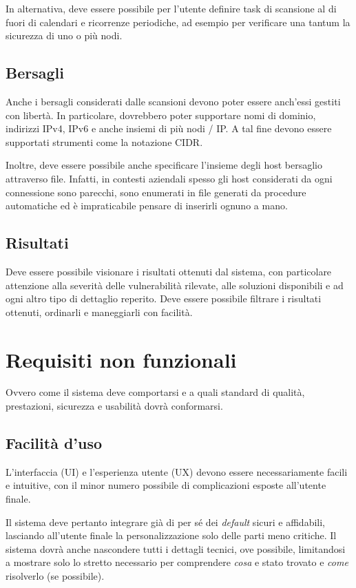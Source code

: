In alternativa, deve essere possibile per l'utente definire task di scansione al di fuori di calendari e ricorrenze periodiche, ad esempio per verificare una tantum la sicurezza di uno o più nodi.

\subsection{Bersagli}
Anche i bersagli considerati dalle scansioni devono poter essere anch'essi gestiti con libertà. In particolare, dovrebbero poter supportare nomi di dominio, indirizzi IPv4, IPv6 e anche insiemi di più nodi / IP. A tal fine devono essere supportati strumenti come la notazione CIDR.

Inoltre, deve essere possibile anche specificare l'insieme degli host bersaglio attraverso file. Infatti, in contesti aziendali spesso gli host considerati da ogni connessione sono parecchi, sono enumerati in file generati da procedure automatiche ed è impraticabile pensare di inserirli ognuno a mano.

\subsection{Risultati}
Deve essere possibile visionare i risultati ottenuti dal sistema, con particolare attenzione alla severità delle vulnerabilità rilevate, alle soluzioni disponibili e ad ogni altro tipo di dettaglio reperito. Deve essere possibile filtrare i risultati ottenuti, ordinarli e maneggiarli con facilità.

\section{Requisiti non funzionali}
Ovvero come il sistema deve comportarsi e a quali standard di qualità, prestazioni, sicurezza e usabilità dovrà conformarsi.

\subsection{Facilità d'uso}
L'interfaccia (UI) e l'esperienza utente (UX) devono essere necessariamente facili e intuitive, con il minor numero possibile di complicazioni esposte all'utente finale.

Il sistema deve pertanto integrare già di per sé dei \emph{default} sicuri e affidabili, lasciando all'utente finale la personalizzazione solo delle parti meno critiche. Il sistema dovrà anche nascondere tutti i dettagli tecnici, ove possibile, limitandosi a mostrare solo lo stretto necessario per comprendere \emph{cosa} e stato trovato e \emph{come} risolverlo (se possibile).

